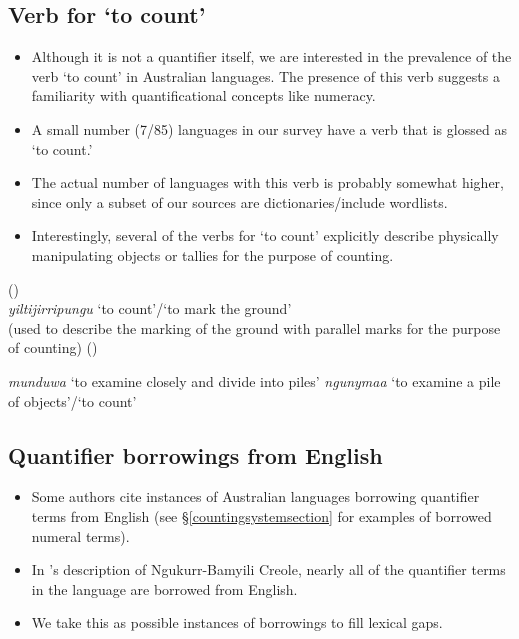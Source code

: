 \documentclass{article}
\makeatletter
\newcommand{\ofy}{/85} %
\makeatother
\begin{document}
\subsection{Verb for `to count'}
\begin{itemize}
\item Although it is not a quantifier itself, we are interested in the prevalence of the verb `to count' in Australian languages. The presence of this verb suggests a familiarity with quantificational concepts like numeracy.
\item A small number (7\ofy) languages in our survey have a verb that is glossed as `to count.'
\item The actual number of languages with this verb is probably somewhat higher, since only a subset of our sources are dictionaries/include wordlists.
\item Interestingly, several of the verbs for `to count' explicitly describe physically manipulating objects or tallies for the purpose of counting.
\end{itemize}

\begin{exe}
   (\citealt[179]{pintupi77})\\
  \textit{yiltijirripungu} `to count'/`to mark the ground'\\
  (used to describe the marking of the ground with parallel marks for the purpose of counting)
   (\citealt{heath84})
  \begin{xlist}
    \ex \textit{munduwa} `to examine closely and divide into piles' 
    \ex \textit{ngunymaa} `to examine a pile of objects'/`to count'
  \end{xlist}
\end{exe} 

\subsection{Quantifier borrowings from English}

\begin{itemize}
\item Some authors cite instances of Australian languages borrowing quantifier terms from English (see \S\ref{countingsystemsection} for examples of borrowed numeral terms).
\item In \cite{sandefur79}'s description of Ngukurr-Bamyili Creole, nearly all of the quantifier terms in the language are borrowed from English.
\item We take this as possible instances of borrowings to fill lexical gaps.
\end{itemize}
\end{document}
